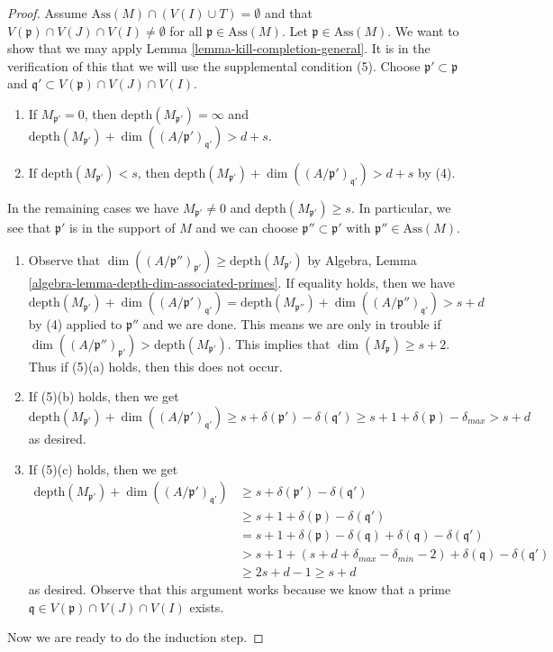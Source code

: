 \documentclass[10pt,a4paper]{amsart}
\theoremstyle{plain}
\theoremstyle{definition}
\theoremstyle{remark}
\numberwithin{equation}{subsection}
\begin{document}
\begin{proof}
\medskip\noindent
Assume $\text{Ass}(M) \cap (V(I) \cup T) = \emptyset$ and that
$V(\mathfrak p) \cap V(J) \cap V(I) \not = \emptyset$
for all $\mathfrak p \in \text{Ass}(M)$.
Let $\mathfrak p \in \text{Ass}(M)$. We want to show that we may apply
Lemma \ref{lemma-kill-completion-general}.
It is in the verification of this that we will use the supplemental
condition (5). Choose $\mathfrak p' \subset \mathfrak p$
and $\mathfrak q' \subset V(\mathfrak p) \cap V(J) \cap V(I)$.
\begin{enumerate}
\item If $M_{\mathfrak p'} = 0$, then
$\text{depth}(M_{\mathfrak p'}) = \infty$ and
$\text{depth}(M_{\mathfrak p'}) +
\dim((A/\mathfrak p')_{\mathfrak q'}) > d + s$.
\item If $\text{depth}(M_{\mathfrak p'}) < s$, then
$\text{depth}(M_{\mathfrak p'}) +
\dim((A/\mathfrak p')_{\mathfrak q'}) > d + s$ by (4).
\end{enumerate}
In the remaining cases we have $M_{\mathfrak p'} \not = 0$ and
$\text{depth}(M_{\mathfrak p'}) \geq s$. In particular, we see that
$\mathfrak p'$ is in the support of $M$ and we can choose
$\mathfrak p'' \subset \mathfrak p'$ with $\mathfrak p'' \in \text{Ass}(M)$.
\begin{enumerate}
\item[(a)] Observe that
$\dim((A/\mathfrak p'')_{\mathfrak p'}) \geq \text{depth}(M_{\mathfrak p'})$
by Algebra, Lemma \ref{algebra-lemma-depth-dim-associated-primes}.
If equality holds, then we have
$$
\text{depth}(M_{\mathfrak p'}) + \dim((A/\mathfrak p')_{\mathfrak q'}) =
\text{depth}(M_{\mathfrak p''}) + \dim((A/\mathfrak p'')_{\mathfrak q'})
> s + d
$$
by (4) applied to $\mathfrak p''$ and we are done. This means we are
only in trouble if
$\dim((A/\mathfrak p'')_{\mathfrak p'}) > \text{depth}(M_{\mathfrak p'})$.
This implies that $\dim(M_\mathfrak p) \geq s + 2$.
Thus if (5)(a) holds, then this does not occur.
\item[(b)] If (5)(b) holds, then we get
$$
\text{depth}(M_{\mathfrak p'}) + \dim((A/\mathfrak p')_{\mathfrak q'})
\geq s + \delta(\mathfrak p') - \delta(\mathfrak q')
\geq s + 1 + \delta(\mathfrak p) - \delta_{max}
> s + d
$$
as desired.
\item[(c)] If (5)(c) holds, then we get
\begin{align*}
\text{depth}(M_{\mathfrak p'}) + \dim((A/\mathfrak p')_{\mathfrak q'})
& \geq
s + \delta(\mathfrak p') - \delta(\mathfrak q') \\
& \geq
s + 1 + \delta(\mathfrak p) - \delta(\mathfrak q') \\
& =
s + 1 + \delta(\mathfrak p) - \delta(\mathfrak q) +
\delta(\mathfrak q) - \delta(\mathfrak q') \\
& >
s + 1 + (s + d + \delta_{max} - \delta_{min} - 2) +
\delta(\mathfrak q) - \delta(\mathfrak q') \\
& \geq 
2s + d - 1 \geq s + d
\end{align*}
as desired. Observe that this argument works because
we know that a prime $\mathfrak q \in V(\mathfrak p) \cap V(J) \cap V(I)$
exists.
\end{enumerate}
Now we are ready to do the induction step.


\end{proof}
\end{document}
